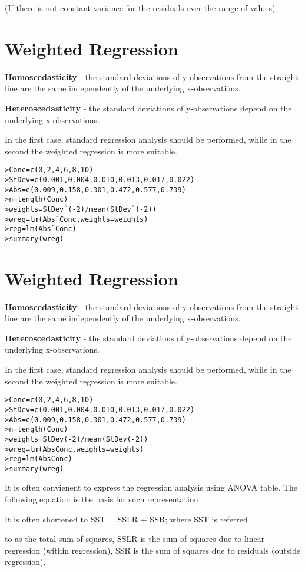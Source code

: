 \documentclass[Master.tex]{subfiles}
\begin{document}
(If there is not constant variance for the residuals over the range of values)


\section{Weighted Regression}

\textbf{Homoscedasticity} - the standard deviations of
y-observations from the straight line are the same independently
of the underlying x-observations.

\textbf{Heteroscedasticity} - the standard deviations of
y-observations depend on the underlying x-observations.

In the first case, standard regression analysis should be
performed, while in the second the weighted regression is more
suitable.

\begin{verbatim}
>Conc=c(0,2,4,6,8,10)
>StDev=c(0.001,0.004,0.010,0.013,0.017,0.022)
>Abs=c(0.009,0.158,0.301,0.472,0.577,0.739)
>n=length(Conc)
>weights=StDevˆ(-2)/mean(StDevˆ(-2))
>wreg=lm(Abs˜Conc,weights=weights)
>reg=lm(Abs˜Conc)
>summary(wreg)
\end{verbatim}

\newpage

\section{Weighted Regression}

\textbf{Homoscedasticity} - the standard deviations of
y-observations from the straight line are the same independently
of the underlying x-observations.

\textbf{Heteroscedasticity} - the standard deviations of
y-observations depend on the underlying x-observations.

In the first case, standard regression analysis should be
performed, while in the second the weighted regression is more
suitable.

\begin{verbatim}
>Conc=c(0,2,4,6,8,10)
>StDev=c(0.001,0.004,0.010,0.013,0.017,0.022)
>Abs=c(0.009,0.158,0.301,0.472,0.577,0.739)
>n=length(Conc)
>weights=StDev(-2)/mean(StDev(-2))
>wreg=lm(AbsConc,weights=weights)
>reg=lm(AbsConc)
>summary(wreg)
\end{verbatim}


It is often convienent to express the regression analysis using
ANOVA table. The following equation is the basis for such
representation

It is often shortened to SST = SSLR + SSR; where SST is referred

to as the total sum of squares, SSLR is the sum of squares due to
linear regression (within regression), SSR is the sum of squares
due to residuals (outside regression).
\end{document}
